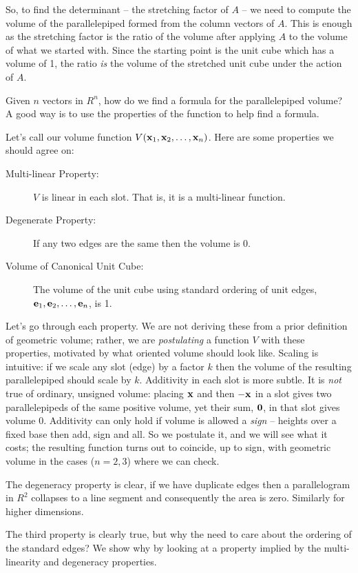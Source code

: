 \documentclass{article}
\begin{document}
So, to find the determinant -- the stretching factor of $A$ -- we need to compute the volume of the parallelepiped formed
from the column vectors of $A$. This is enough as the stretching factor is the ratio of the
volume after applying $A$ to the volume of what we started with.  Since the starting
point is the unit cube which has a volume of 1, the ratio {\em is\/} the volume of the stretched unit cube
under the action of $A$.

Given $n$ vectors in $R^n$, how do we find a formula for the parallelepiped volume?
A good way is to use the properties of the function to help find a formula.

Let's call our volume function $V({\bf x}_1, {\bf x}_2, \ldots, {\bf x}_n)$.
Here are some properties we should agree on:
\begin{description}
\item[Multi-linear Property:] $V$ is linear in each slot. That is,
    it is a multi-linear function.
\item[Degenerate Property:] If any two edges are the same then the volume is $0$.
\item[Volume of Canonical Unit Cube:] The volume of the unit cube using
    standard ordering of unit edges, ${\bf e}_1, {\bf e}_2, \ldots , {\bf e}_n$, is 1.
\end{description}
Let's go through each property. We are not deriving these from a prior
definition of geometric volume; rather, we are {\em postulating\/} a function $V$
with these properties, motivated by what oriented volume should look like.
Scaling is intuitive: if we scale any slot (edge) by a factor $k$ then the
volume of the resulting parallelepiped should scale by $k$. Additivity in each
slot is more subtle. It is {\em not\/} true of ordinary, unsigned volume:
placing ${\bf x}$ and then $-{\bf x}$ in a slot gives two parallelepipeds of
the same positive volume, yet their sum, ${\bf 0}$, in that slot gives volume
$0$. Additivity can only hold if volume is allowed a {\em sign\/} -- heights
over a fixed base then add, sign and all. So we postulate it, and we will
see what it costs; the resulting function turns out to coincide, up to
sign, with geometric volume in
the cases ($n = 2, 3$) where we can check.

The degeneracy property is clear, if we have duplicate edges then a parallelogram
in $R^2$ collapses to a line segment and consequently the area is zero. Similarly
for higher dimensions.

The third property is clearly true, but why the need to care about the ordering
of the standard edges? We show why by looking at a property implied by the
multi-linearity and degeneracy properties.
    
\end{document}
